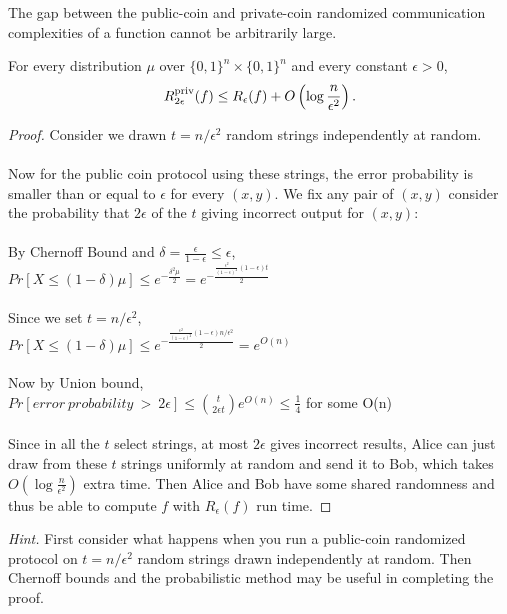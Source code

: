 The gap between the public-coin and private-coin randomized communication complexities of a function cannot be arbitrarily large. 

\begin{theorem}
	For every distribution $\mu$ over $\{0,1\}^n \times \{0,1\}^n$ and every constant $\epsilon > 0$,
	\[
	R^{\mathrm{priv}}_{2\epsilon}(f) \le R_\epsilon(f) + O\left(\log \frac{n}{\epsilon^2}\right).
	\]
\end{theorem}

\begin{proof}
	Consider we drawn $t = n/\epsilon^2$ random strings independently at random. \\
	\\
	Now for the public coin protocol using these strings, the error probability is smaller than or equal to $\epsilon$ for every $(x,y)$. We fix any pair of $(x,y)$ consider the probability that $2\epsilon$ of the $t$ giving incorrect output for $(x,y)$:\\
	\\
	By Chernoff Bound and $\delta = \frac{\epsilon}{1-\epsilon} \leq \epsilon$,\\
	$Pr[X \leq (1-\delta)\mu] \leq e^{-\frac{\delta^2\mu}{2}} = e^{-\frac{\frac{\epsilon^2}{(1-\epsilon)^2}(1-\epsilon) t}{2}}$\\
	\\
	Since we set $t = n/\epsilon^2$,\\
	$Pr[X \leq (1-\delta)\mu] \leq e^{-\frac{\frac{\epsilon^2}{(1-\epsilon)^2}(1-\epsilon)  n/\epsilon^2}{2}} = e^{O(n)}$\\
	\\
	Now by Union bound, \\
	$Pr[error\ probability\ >\ 2\epsilon] \leq \binom{t}{2\epsilon t}e^{O(n)} \leq \frac14$ for some O(n)\\
	\\
	Since in all the $t$ select strings, at most $2\epsilon$ gives incorrect results, Alice can just draw from these $t$ strings uniformly at random and send it to Bob, which takes $O(\log \frac{n}{\epsilon^2})$ extra time. Then Alice and Bob have some shared randomness and thus be able to compute $f$ with $R_\epsilon(f)$ run time.
\end{proof}

\bigskip
\begin{remark}
	\emph{Hint.} First consider what happens when you run a public-coin randomized protocol on $t = n/\epsilon^2$ random strings drawn independently at random. Then Chernoff bounds and the probabilistic method may be useful in completing the proof.
\end{remark}



